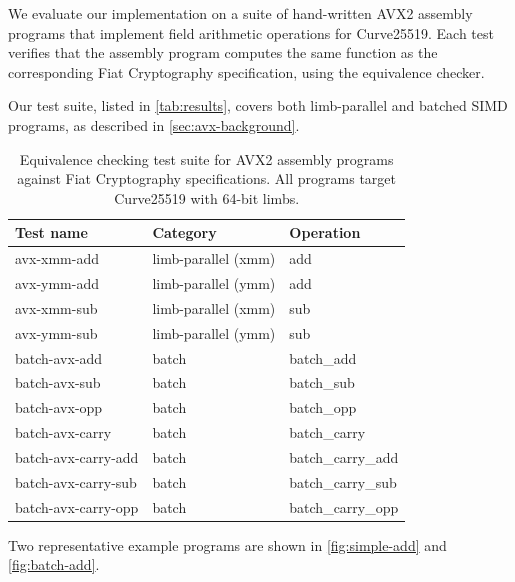 We evaluate our implementation on a suite of hand-written AVX2 assembly programs that implement field arithmetic operations for Curve25519.
Each test verifies that the assembly program computes the same function as the corresponding Fiat Cryptography specification, using the equivalence checker.

Our test suite, listed in \autoref{tab:results}, covers both limb-parallel and batched SIMD programs, as described in \autoref{sec:avx-background}.

\begin{table}[h]
\centering
\begin{tabular}{lll}
\toprule
\textbf{Test name} & \textbf{Category} & \textbf{Operation} \\
\midrule
avx-xmm-add        & limb-parallel (xmm) & add \\
avx-ymm-add        & limb-parallel (ymm) & add \\
avx-xmm-sub        & limb-parallel (xmm) & sub \\
avx-ymm-sub        & limb-parallel (ymm) & sub \\
batch-avx-add       & batch & batch\_add \\
batch-avx-sub       & batch & batch\_sub \\
batch-avx-opp       & batch & batch\_opp \\
batch-avx-carry     & batch & batch\_carry \\
batch-avx-carry-add & batch & batch\_carry\_add \\
batch-avx-carry-sub & batch & batch\_carry\_sub \\
batch-avx-carry-opp & batch & batch\_carry\_opp \\
\bottomrule
\end{tabular}
\caption{Equivalence checking test suite for AVX2 assembly programs against Fiat Cryptography specifications. All programs target Curve25519 with 64-bit limbs.}
\label{tab:results}
\end{table}

Two representative example programs are shown in \autoref{fig:simple-add} and \autoref{fig:batch-add}.

%


